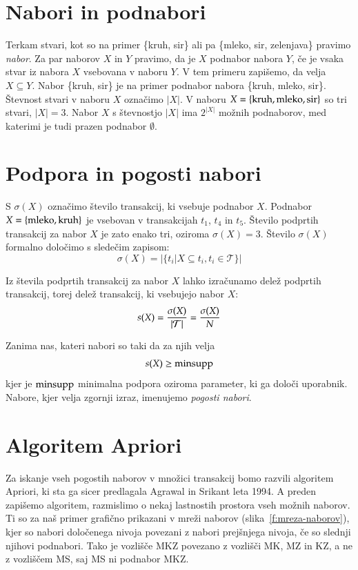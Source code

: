 \section{Nabori in podnabori}

Terkam stvari, kot so na primer \{kruh, sir\} ali pa \{mleko, sir, zelenjava\} pravimo {\em nabor}. Za par naborov $X$ in $Y$ pravimo, da je $X$ podnabor nabora $Y$, če je vsaka stvar iz nabora $X$ vsebovana v naboru $Y$. V tem primeru zapišemo, da velja $X\subseteq Y$. Nabor \{kruh, sir\} je na primer podnabor nabora \{kruh, mleko, sir\}. Števnost stvari v naboru $X$ označimo $|X|$. V naboru $X=\{{\rm kruh}, {\rm mleko}, {\rm sir}\}$ so tri stvari, $|X|=3$. Nabor $X$ s števnostjo $|X|$ ima $2^{|X|}$ možnih podnaborov, med katerimi je tudi prazen podnabor $\emptyset$.

\section{Podpora in pogosti nabori}

S $\sigma(X)$ označimo število transakcij, ki vsebuje podnabor $X$. Podnabor $X=\{{\rm mleko}, {\rm kruh}\}$ je vsebovan v transakcijah $t_1$, $t_4$ in $t_5$. Število podprtih transakcij za nabor $X$ je zato enako tri, oziroma $\sigma(X)=3$. Število $\sigma(X)$ formalno določimo s sledečim zapisom:
%
\begin{equation}
  \sigma(X)=|\{t_i|X\subseteq t_i, t_i\in {\mathcal T}\}|
\end{equation}

Iz števila podprtih transakcij za nabor $X$ lahko izračunamo delež podprtih transakcij, torej delež transakcij, ki vsebujejo nabor $X$:
%
\begin{equation}
  s(X)={\sigma(X)\over |{\mathcal T}|}={\sigma(X)\over N}
\end{equation}

Zanima nas, kateri nabori so taki da za njih velja
\begin{equation}
  s(X)\geq{\rm minsupp}
\end{equation}
kjer je ${\rm minsupp}$ minimalna podpora oziroma parameter, ki ga določi uporabnik. Nabore, kjer velja zgornji izraz, imenujemo {\em pogosti nabori}.

\section{Algoritem Apriori}

Za iskanje vseh pogostih naborov v množici transakcij bomo razvili algoritem Apriori, ki sta ga sicer predlagala Agrawal in Srikant leta 1994. A preden zapišemo algoritem, razmislimo o nekaj lastnostih prostora vseh možnih naborov. Ti so za naš primer grafično prikazani v mreži naborov (slika~\ref{f:mreza-naborov}), kjer so nabori določenega nivoja povezani z nabori prejšnjega nivoja, če so slednji njihovi podnabori. Tako je vozlišče MKZ povezano z vozlišči MK, MZ in KZ, a ne z vozliščem MS, saj MS ni podnabor MKZ.


